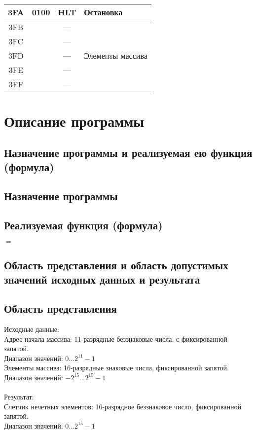 \begin{center}
\begin{tabular}{|c|c|c|l|}
3FA & 0100 & HLT & Остановка \\

\hline
\hline
3FB &  & --- & \\

3FC &  & --- & \\

3FD &  & --- & Элементы массива \\

3FE &  & --- & \\

3FF &  & --- & \\

\hline
\end{tabular}
\end{center}

\section{Описание программы}
\subsection{Назначение программы и реализуемая ею функция (формула)}
\subsection*{Назначение программы}
\noindent

\subsection*{Реализуемая функция (формула)}
\noindent $=$

\subsection{Область представления и область допустимых значений исходных данных и результата}

\subsection*{Область представления}
\noindent
Исходные данные: \\
Aдрес начала массива: 11-разрядные беззнаковые числа, с фиксированной запятой.\\
Диапазон значений: $0\ldots2^{11}-1$ \\
Элементы массива: 16-разрядные знаковые числа, фиксированной запятой.\\
Диапазон значений:  $-2^{15}\ldots2^{15}-1$ \\\\
Результат: \\
Счетчик нечетных элементов: 16-разрядное беззнаковое число, фиксированной запятой.\\
Диапазон значений:  $0\ldots2^{15}-1$

